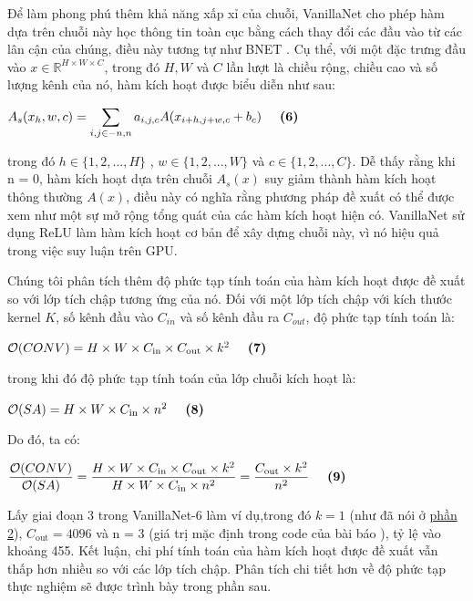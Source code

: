 \documentclass[a4paper,12pt]{article}
\begin{document}
Để làm phong phú thêm khả năng xấp xỉ của chuỗi, VanillaNet cho phép hàm dựa trên chuỗi này học thông tin toàn cục bằng cách thay đổi các đầu vào từ các lân cận của chúng, điều này tương tự như BNET \cite{xu2020batchnormalizationenhancedlinear}. Cụ thể, với một đặc trưng đầu vào \( x \in \mathbb{R}^{H \times W \times C} \), trong đó \( H, W \) và \( C \) lần lượt là chiều rộng, chiều cao và số lượng kênh của nó, hàm kích hoạt được biểu diễn như sau:
\begin{center}
$A_s(x_h,w,c) = \displaystyle\sum_{i,j \in {-n,n}}a_{i,j,c}A(x_{i+h, j+w, c} + b_c) \hspace*{5mm} \textbf{(6)}$
\end{center}
trong đó $h \in \{1, 2,..., H\}$ , $w \in \{1,2,...,W\}$ và $c \in \{1,2,...,C\}$. Dễ thấy rằng khi n = 0,  hàm kích hoạt dựa trên chuỗi $A_s(x)$ suy giảm thành hàm kích hoạt thông thường $A(x)$, điều này có nghĩa rằng phương pháp đề xuất có thể được xem như một sự mở rộng tổng quát của các hàm kích hoạt hiện có. VanillaNet sử dụng ReLU làm hàm kích hoạt cơ bản để xây dựng chuỗi này, vì nó hiệu quả trong việc suy luận trên GPU.

Chúng tôi phân tích thêm độ phức tạp tính toán của hàm kích hoạt được đề xuất so với lớp tích chập tương ứng của nó. Đối với một lớp tích chập với kích thước kernel \( K \), số kênh đầu vào \( C_{in} \) và số kênh đầu ra \( C_{out} \), độ phức tạp tính toán là:
\begin{center}
    $\mathcal{O}(CONV) = H \times W \times C_{\text{in}} \times C_{\text{out}} \times k^2 \hspace*{5mm} \textbf{(7)}$
\end{center}
trong khi đó độ phức tạp tính toán của lớp chuỗi kích hoạt là:
\begin{center}
    $\mathcal{O}(SA) = H \times W \times C_{\text{in}} \times n^2 \hspace*{5mm} \textbf{(8)}$
\end{center}
Do đó, ta có:
\begin{center}
    $\displaystyle\frac{\mathcal{O}(CONV)}{\mathcal{O}(SA)} = \frac{H\times W \times C_{\text{in}} \times C_{\text{out}} \times k^2}{H \times W \times C_{\text{in}} \times n^2} = \frac{C_{\text{out}}\times k^2}{n^2} \hspace*{5mm} \textbf{(9)}$
\end{center}
Lấy giai đoạn 3 trong VanillaNet-6 làm ví dụ,trong đó $k = 1$ (như đã nói ở \hyperref[section]{phần 2}), $C_{\text{out}} = 4096$ và n = 3 (giá trị mặc định trong code của bài báo \cite{chen2023vanillanetpowerminimalismdeep}), tỷ lệ vào khoảng 455. Kết luận, chi phí tính toán của hàm kích hoạt được đề xuất vẫn thấp hơn nhiều so với các lớp tích chập. Phân tích chi tiết hơn về độ phức tạp thực nghiệm sẽ được trình bày trong phần sau.       
\end{document}
